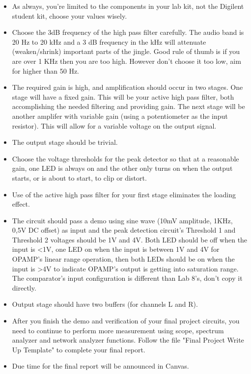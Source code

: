 \begin{itemize}
	\item As always, you're limited to the components in your lab kit, not the Digilent student kit, choose your values wisely.
	\item Choose the 3dB frequency of the high pass filter carefully. The audio band is 20 Hz to 20 kHz and a 3 dB frequency in the kHz will attenuate (weaken/shrink) important parts of the jingle. Good rule of thumb is if you are over 1 KHz then you are too high. However don't choose it too low, aim for higher than 50 Hz.
	\item The required gain is high, and amplification should occur in two stages. One stage will have a fixed gain. This will be your active high pass filter, both accomplishing the needed filtering and providing gain. The next stage will be another amplifer with variable gain (using a potentiometer as the input resistor). This will allow for a variable voltage on the output signal.
	\item The output stage should be trivial.
	\item Choose the voltage thresholds for the peak detector so that at a reasonable gain, one LED is always on and the other only turns on when the output starts, or is about to start, to clip or distort. 
	\item Use of the active high pass filter for your first stage eliminates the loading effect.
	\item The circuit should pass a demo using sine wave (10mV amplitude, 1KHz, 0,5V DC offset) as input and the peak detection circuit's Threshold 1 and Threshold 2 voltages should be 1V and 4V.  Both LED should be off when the input is <1V, one LED on when the input is between 1V and 4V for OPAMP's linear range operation, then both LEDs should be on when the input is >4V to indicate OPAMP's output is getting into saturation range. The comparator's input configuration is different than Lab 8's, don't copy it directly.
	\item Output stage should have two buffers (for channels L and R).
	\item After you finish the demo and verification of your final project circuits, you need to continue to perform more measurement using scope, spectrum analyzer and network analyzer functions. Follow the file "Final Project Write Up Template" to complete your final report. 
	\item Due time for the final report will be announced in Canvas.  

\end{itemize}

